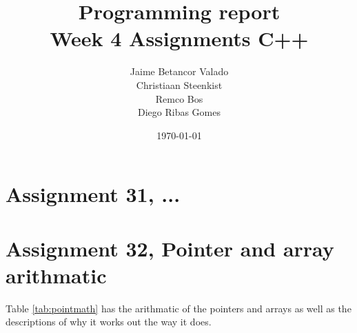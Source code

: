 \documentclass[11pt]{article}
\begin{document}
\title{Programming report \\
       Week 4 Assignments C++
}
\date{\today}
\author{Jaime Betancor Valado \\
Christiaan Steenkist \\
Remco Bos \\
Diego Ribas Gomes
}

\maketitle

\section*{Assignment 31, ...}

\section*{Assignment 32, Pointer and array arithmatic}
Table \ref{tab:pointmath} has the arithmatic of the pointers and arrays as well as the descriptions of why it works out the way it does.
\end{document}
